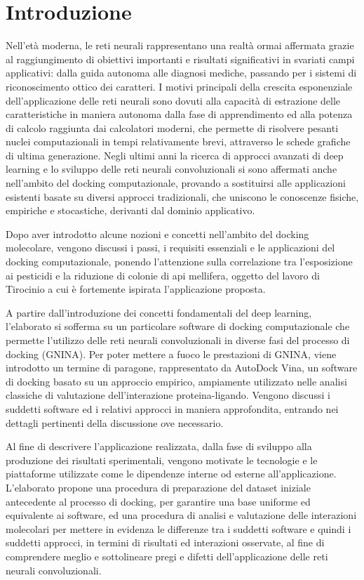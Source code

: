 \chapter*{Introduzione}
Nell'età moderna, le reti neurali rappresentano una realtà ormai affermata grazie al raggiungimento di obiettivi importanti e risultati significativi in svariati campi applicativi: dalla guida autonoma alle diagnosi mediche, passando per i sistemi di riconoscimento ottico dei caratteri. I motivi principali della crescita esponenziale dell'applicazione delle reti neurali sono dovuti alla capacità di estrazione delle caratteristiche in maniera autonoma dalla fase di apprendimento ed alla potenza di calcolo raggiunta dai calcolatori moderni, che permette di risolvere pesanti nuclei computazionali in tempi relativamente brevi, attraverso le schede grafiche di ultima generazione. 
Negli ultimi anni la ricerca di approcci avanzati di deep learning e lo sviluppo delle reti neurali convoluzionali si sono affermati anche nell'ambito del docking computazionale, provando a sostituirsi alle applicazioni esistenti basate su diversi approcci tradizionali, che uniscono le conoscenze fisiche, empiriche e stocastiche, derivanti dal dominio applicativo. 

Dopo aver introdotto alcune nozioni e concetti nell'ambito del docking molecolare, vengono discussi i passi, i requisiti essenziali e le applicazioni del docking computazionale, ponendo l'attenzione sulla correlazione tra l'esposizione ai pesticidi e la riduzione di colonie di api mellifera, oggetto del lavoro di Tirocinio a cui è fortemente ispirata l'applicazione proposta. 


A partire dall'introduzione dei concetti fondamentali del deep learning, l'elaborato si sofferma su un particolare software di docking computazionale che permette l'utilizzo delle reti neurali convoluzionali in diverse fasi del processo di docking (GNINA). Per poter mettere a fuoco le prestazioni di GNINA, viene introdotto un termine di paragone, rappresentato da AutoDock Vina, un software di docking basato su un approccio empirico, ampiamente utilizzato nelle analisi classiche di valutazione dell'interazione proteina-ligando. Vengono discussi i suddetti software ed i relativi approcci in maniera approfondita, entrando nei dettagli pertinenti della discussione ove necessario. 


Al fine di descrivere l'applicazione realizzata, dalla fase di sviluppo alla produzione dei risultati sperimentali, vengono motivate le tecnologie e le piattaforme utilizzate come le dipendenze interne od esterne all'applicazione.
L'elaborato propone una procedura di preparazione del dataset iniziale antecedente al processo di docking, per garantire una base uniforme ed equivalente ai software, ed una procedura di analisi e valutazione delle interazioni molecolari per mettere in evidenza le differenze tra i suddetti software e quindi i suddetti approcci, in termini di risultati ed interazioni osservate, al fine di comprendere meglio e sottolineare pregi e difetti dell'applicazione delle reti neurali convoluzionali. 

